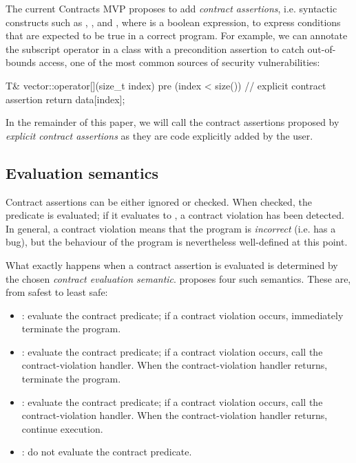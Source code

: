 The current Contracts MVP \cite{P2900R7} proposes to add \emph{contract assertions}, i.e. syntactic constructs such as , , and , where  is a boolean expression, to express conditions that are expected to be true in a correct program. For example, we can annotate the subscript operator in a  class with a precondition assertion to catch out-of-bounds access, one of the most common sources of security vulnerabilities:
\begin{codeblock}
T& vector::operator[](size_t index)
pre (index < size()) {  // explicit contract assertion
  return data[index];     
}
\end{codeblock}

In the remainder of this paper, we will call the contract assertions proposed by  \cite{P2900R7} \emph{explicit contract assertions} as they are code explicitly added by the user.

\subsection{Evaluation semantics}

Contract assertions can be either ignored or checked. When checked, the predicate  is evaluated; if it evaluates to , a contract violation has been detected. In general, a contract violation means that the program is \emph{incorrect} (i.e. has a bug), but the behaviour of the program is nevertheless well-defined at this point. 

What exactly happens when a contract assertion is evaluated is determined by the chosen \emph{contract evaluation semantic}. \cite{P2900R7} proposes four such semantics. These are, from safest to least safe:
\begin{itemize}
\item {}: evaluate the contract predicate; if a contract violation occurs, immediately terminate the program.
\item {}: evaluate the contract predicate; if a contract violation occurs, call the contract-violation handler. When the contract-violation handler returns, terminate the program.
\item {}: evaluate the contract predicate; if a contract violation occurs, call the contract-violation handler. When the contract-violation handler returns, continue execution.
\item {}: do not evaluate the contract predicate.
\end{itemize}

